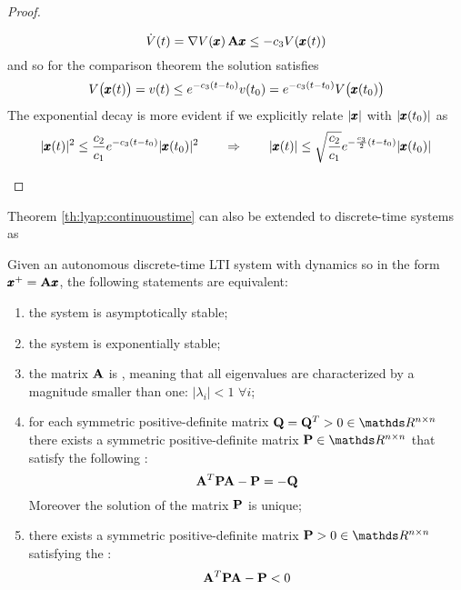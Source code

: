 \begin{proof}
\begin{enumerate}[\itshape a)]
		\[ \dot V(t) = \nabla V(\x)\, \A \x \leq -c_3 V(\x(t)) \]
		and so for the comparison theorem the solution satisfies
		\[ V\big(\x(t)\big) = v(t) \leq e^{-c_3(t-t_0)} v(t_0) = e^{-c_3(t-t_0)} V\big(\x(t_0)\big) \]
		The exponential decay is more evident if we explicitly relate $|\x|$ with $|\x(t_0)|$ as
		\[ |\x(t)|^2 \leq \frac{c_2}{c_1} e^{-c_3(t-t_0)} |\x(t_0)|^2 \qquad \Rightarrow \qquad |\x(t)| \leq \sqrt{\frac{c_2}{c_1}} e^{-\frac{c_3}{2} (t-t_0) } |\x(t_0)| \]
		
	\end{enumerate}
	\end{proof}

	Theorem \ref{th:lyap:continuoustime} can also be extended to discrete-time systems as
	
	\begin{theorem} \label{th:lyap:discretetime}
		Given an autonomous discrete-time LTI system with dynamics so in the form $\xp = \A \x$, the following statements are equivalent:
		\begin{enumerate}[\itshape i)]
			\item the system is asymptotically stable;
			\item the system is exponentially stable;
			\item the matrix $\A$ is , meaning that all eigenvalues are characterized by a magnitude smaller than one: $|\lambda_i| < 1 $ $\forall i$;
			\item for each symmetric positive-definite matrix $\Q = \Q^T > 0 \in \mathds R^{n\times n}$ there exists a symmetric positive-definite matrix $\P \in \mathds R^{n\times n}$ that satisfy the following :
			\begin{equation}
				\A^T \P \A - \P = - \Q
			\end{equation}
			Moreover the solution of the matrix $\P$ is unique;
			\item there exists a symmetric positive-definite matrix $\P>0 \in \mathds R^{n\times n}$ satisfying the :
			\begin{equation}
				\A^T \P \A - \P < 0
			\end{equation}
		\end{enumerate}
	\end{theorem}

